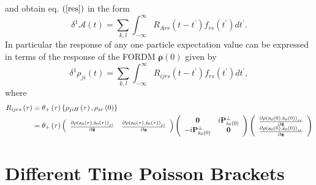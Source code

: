 \documentclass[aps,preprint]{revtex4}%
\begin{document}
and obtain eq. $\left(  \ref{res}\right)  $ in the form
\begin{equation}
\delta^{1}\mathcal{A}\left(  t\right)  =\sum_{k,l}\int_{-\infty}^{\infty
}R_{Ars}\left(  t-t^{\prime}\right)  f_{rs}\left(  t^{\prime}\right)
dt^{\prime}.
\end{equation}
In particular the response of any one particle expectation value can be
expressed in terms of the response of the FORDM $\mathbf{\rho}\left(
0\right)  $ given by
\begin{equation}
\delta^{1}\rho_{ji}\left(  t\right)  =\sum_{k,l}\int_{-\infty}^{\infty
}R_{ijrs}\left(  t-t^{\prime}\right)  f_{rs}\left(  t^{\prime}\right)
dt^{\prime},
\end{equation}
where
\begin{align}
R_{ijrs}\left(  \tau\right)   &  =\theta_{+}\left(  \tau\right)  \left\{
\rho_{jiH}\left(  \tau\right)  ,\rho_{sr}\left(  0\right)  \right\}
\nonumber\\
&  =\theta_{+}\left(  \tau\right)  \left(
\begin{array}
[c]{cc}%
\frac{\partial\rho\left(  \mathrm{z}_{0}\left(  \tau\right)  ,\mathrm{\bar{z}%
}_{0}\left(  \tau\right)  \right)  _{ji}}{\partial\mathbf{\bar{z}}} &
\frac{\partial\rho\left(  \mathrm{z}_{0}\left(  \tau\right)  ,\mathrm{\bar{z}%
}_{0}\left(  \tau\right)  \right)  _{ji}}{\partial\mathbf{z}}%
\end{array}
\right)  \left(
\begin{array}
[c]{cc}%
\mathbf{0} & i\mathbf{P}_{\mathrm{z}_{0}\left(  0\right)  }^{\bot}\\
-i\mathbf{P}_{\mathrm{\bar{z}}_{0}\left(  0\right)  }^{\bot} & \mathbf{0}%
\end{array}
\right)  \left(
\begin{array}
[c]{c}%
\frac{\partial\rho\left(  \mathrm{z}_{0}\left(  0\right)  ,\mathrm{\bar{z}%
}_{0}\left(  0\right)  \right)  _{sr}}{\partial\mathbf{\bar{z}}}\\
\frac{\partial\rho\left(  \mathrm{z}_{0}\left(  0\right)  ,\mathrm{\bar{z}%
}_{0}\left(  0\right)  \right)  _{sr}}{\partial\mathbf{z}}%
\end{array}
\right)
\end{align}


\section{Different Time Poisson Brackets\label{DifTPB}}
\end{document}

